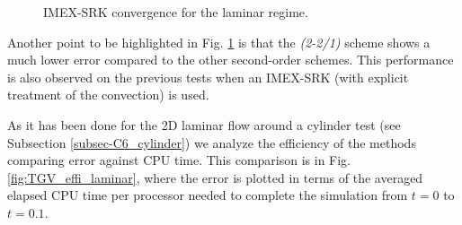 \begin{figure}[h!]
  \centering
  \caption{IMEX-SRK convergence for the laminar regime.}
  \label{fig:TGV_conv_laminar}
\end{figure}

Another point to be highlighted in Fig. \ref{fig:TGV_conv_laminar} is that the \textit{(2-2/1)} scheme shows a much lower error compared to the other second-order schemes. This performance is also observed on the previous tests when an IMEX-SRK (with explicit treatment of the convection) is used. 

As it has been done for the 2D laminar flow around a cylinder test (see Subsection \ref{subsec-C6_cylinder}) we analyze the efficiency of the methods comparing error  against CPU time. This comparison is in  Fig. \ref{fig:TGV_effi_laminar}, where the error is plotted in terms of the averaged elapsed CPU time per processor needed to complete the simulation from $t=0$ to $t=0.1$.

